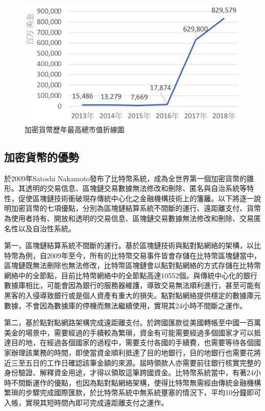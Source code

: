			\begin{figure}[htbp]
				\centering
				\includegraphics[width = .7\textwidth]{Thetotalmarketcapitalization.png}
				\caption{加密貨幣歷年最高總市值折線圖\supercite{CryptocurrencyMarketCapitalizations}}\label{Thetotalmarketcapitalization}
			\end{figure}
		

			\subsection{加密貨幣的優勢}
			於2009年Satoshi Nakamoto發布了比特幣系統，成為全世界第一個加密貨幣的雛形。其透明的交易信息、區塊鏈交易數據無法修改和刪除、匿名與⾃治系統等特性，促使區塊鏈技術衝破現存傳統中⼼化之⾦融機構技術上的籓籬。以下將逐一說明加密貨幣的七項優點，分別為區塊鏈結算系統不間斷的運行、遠距離支付、貨幣為使用者持有、開放和透明的交易信息、區塊鏈交易數據無法修改和刪除、交易匿名性以及自治性系統。

				第一，區塊鏈結算系統不間斷的運行。基於區塊鏈技術與點對點網絡的架構，以比特幣為例，自2009年至今，所有的比特幣交易事件皆會存儲在比特幣區塊鏈當中，區塊鏈既無法刪除也無法修改，比特幣區塊鏈會以點對點網絡的方式存儲在比特幣網絡中的全節點\supercite{YouReallyShouldRunaBitcoinFullNode:HeresWhy}，目前比特幣網絡中的全節點高達10552個。與傳統中心化的銀行數據庫相比，可能會因為銀行的服務器維護，導致交易無法順利進行，甚至可能有黑客的入侵導致銀行或是個人資產有重大的損失。點對點網絡提供穩定的數據庫元數據，不會因為數據庫的停機而無法繼續使用，實現其24小時不間斷之運作。
				
				第二，基於點對點網路架構完成遠距離支付。於跨國匯款從美國轉帳至中國一百萬美金的場景中，需要經過的手續較為繁瑣，資金有可能需要經過多個國家才可以抵達目的地，在經過各個國家的過程中，需要支付各國的手續費，也需要等待各個國家辦理該業務的時間，即使當資金順利抵達了目的地銀行，目的地銀行也需要花將近三至五日的工作日確認該筆金額的來源。屆時領款人亦需要前往銀行核實完整的身份驗證、解釋資金用途，才得以領取這筆跨國資金。比特幣系統當中，有著24小時不間斷運作的優點，也因為點對點網絡架構，使得比特幣無需經由傳統金融機構繁瑣的步驟完成國際匯款，於比特幣系統中無系統壅塞的情況下，平均10分鐘即可入帳，實現其短時間內即可完成遠距離支付之運作。

